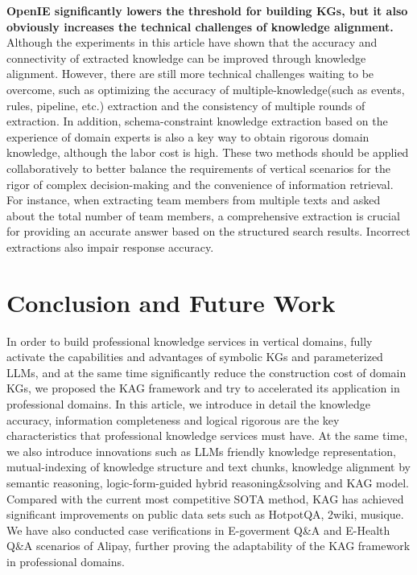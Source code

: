 \documentclass{article}
\begin{document}
\textbf{OpenIE significantly lowers the threshold for building KGs, but it also obviously increases the technical challenges of knowledge alignment.} Although the experiments in this article have shown that the accuracy and connectivity of extracted knowledge can be improved through knowledge alignment. However, there are still more technical challenges waiting to be overcome, such as optimizing the accuracy of multiple-knowledge(such as events, rules, pipeline, etc.) extraction and the consistency of multiple rounds of extraction. In addition, schema-constraint knowledge extraction based on the experience of domain experts is also a key way to obtain rigorous domain knowledge, although the labor cost is high. These two methods should be applied collaboratively to better balance the requirements of vertical scenarios for the rigor of complex decision-making and the convenience of information retrieval. For instance, when extracting team members from multiple texts and asked about the total number of team members, a comprehensive extraction is crucial for providing an accurate answer based on the structured search results. Incorrect extractions also impair response accuracy.

\section{Conclusion and Future Work}
In order to build professional knowledge services in vertical domains, fully activate the capabilities and advantages of symbolic KGs and parameterized LLMs, and at the same time significantly reduce the construction cost of domain KGs, we proposed the KAG framework and try to accelerated its application in professional domains.
In this article, we introduce in detail the knowledge accuracy, information completeness and logical rigorous are the key characteristics that professional knowledge services must have. At the same time, we also introduce innovations such as LLMs friendly knowledge representation, mutual-indexing of knowledge structure and text chunks, knowledge alignment by semantic reasoning, logic-form-guided hybrid reasoning\&solving and KAG model. Compared with the current most competitive SOTA method, KAG has achieved significant improvements on public data sets such as HotpotQA, 2wiki, musique. We have also conducted case verifications in E-goverment Q\&A and E-Health Q\&A scenarios of Alipay, further proving the adaptability of the KAG framework in professional domains.\newline 
\end{document}
